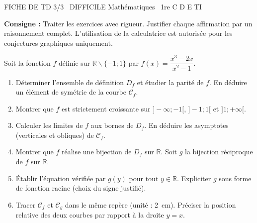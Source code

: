 \documentclass[11pt]{article}
\def\setminus{\mathbin{\backslash}}\let\smallsetminus\setminus
\begin{document}
\begin{tcolorbox}[enhanced,colback=popink,colframe=popink,arc=10pt,boxrule=0pt,left=12pt,right=12pt,top=9pt,bottom=9pt]
{\color{white}\popxbold\small FICHE DE TD 3/3 \textbullet\ DIFFICILE \hfill Mathématiques \textbullet\ 1re C D E TI\par}
\end{tcolorbox}
\vspace{4pt}
\noindent \textbf{Consigne :} Traiter les exercices avec rigueur. Justifier chaque affirmation par un raisonnement complet. L'utilisation de la calculatrice est autorisée pour les conjectures graphiques uniquement.

\begin{exercice}
Soit la fonction $f$ définie sur $\mathbb{R}\setminus\{-1; 1\}$ par $f(x)=\dfrac{x^3-2x}{x^2-1}$.
\begin{enumerate}
    \item Déterminer l'ensemble de définition $D_f$ et étudier la parité de $f$. En déduire un élément de symétrie de la courbe $\mathcal{C}_f$.
    \item Montrer que $f$ est strictement croissante sur $]-\infty; -1[$, $]-1; 1[$ et $]1; +\infty[$.
    \item Calculer les limites de $f$ aux bornes de $D_f$. En déduire les asymptotes (verticales et obliques) de $\mathcal{C}_f$.
    \item Montrer que $f$ réalise une bijection de $D_f$ sur $\mathbb{R}$. Soit $g$ la bijection réciproque de $f$ sur $\mathbb{R}$.
    \item Établir l'équation vérifiée par $g(y)$ pour tout $y\in\mathbb{R}$. Expliciter $g$ sous forme de fonction racine (choix du signe justifié).
    \item Tracer $\mathcal{C}_f$ et $\mathcal{C}_g$ dans le même repère (unité : \SI{2}{cm}). Préciser la position relative des deux courbes par rapport à la droite $y=x$.
\end{enumerate}
\end{exercice}
\end{document}
